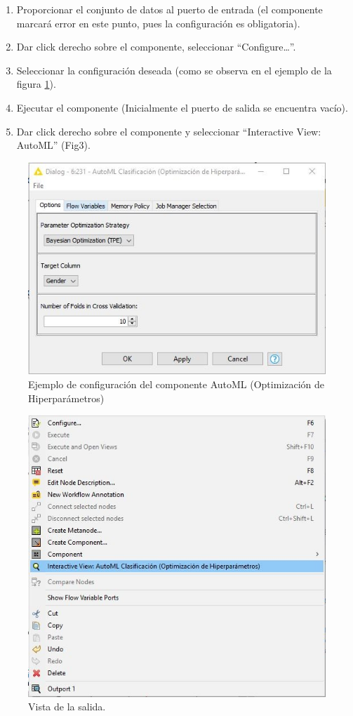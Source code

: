 \begin{enumerate}
	\item Proporcionar el conjunto de datos al puerto de entrada (el componente marcará error en este punto, pues la configuración es obligatoria).
	\item Dar click derecho sobre el componente, seleccionar “Configure…”. 
	\item Seleccionar la configuración deseada (como se observa en el ejemplo de la figura \ref{fig:config-automl-hpo}). 
	\item Ejecutar el componente (Inicialmente el puerto de salida se encuentra vacío).
	\item Dar click derecho sobre el componente y seleccionar “Interactive View: AutoML” (Fig3). 
\end{enumerate}

\begin{figure}[H]
	\centering
	\includegraphics[width=0.5\linewidth]{"figuras/capi 2/config-automl-hpo"}
	\caption[Ejemplo de configuración del componente AutoML (Optimización de Hiperparámetros)]{Ejemplo de configuración del componente AutoML (Optimización de Hiperparámetros)}
	\label{fig:config-automl-hpo}
\end{figure}

\begin{figure}[H]
	\centering
	\includegraphics[width=0.5\linewidth]{"figuras/capi 2/automl-hpo-vista-salida"}
	\caption[Vista de la salida.]{Vista de la salida.}
	\label{fig:automl-hpo-vista-salida}
\end{figure}

